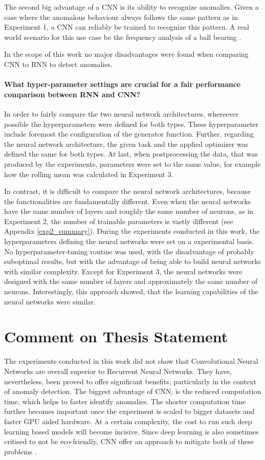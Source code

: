 The second big advantage of a CNN is its ability to recognize anomalies. Given a case where the anomalous behaviour always follows the same pattern as in Experiment 1, a CNN can reliably be trained to recognize this pattern. A real world scenario for this use case be the frequency analysis of a ball bearing \parencite{Mais2002}.

In the scope of this work no major disadvantages were found when comparing CNN to RNN to detect anomalies.


\paragraph{What hyper-parameter settings are crucial for a fair performance comparison between RNN and CNN?} In order to fairly compare the two neural network architectures, whereever possible the hyperparameters were defined for both types. These hyperparameter include foremost the configuration of the generator function. Further, regarding the neural network architecture, the given task and the applied optimizer was defined the same for both types. At last, when postprocessing the data, that was produced by the experiments, parameters were set to the same value, for example how the rolling mean was calculated in Experiment 3.

In contrast, it is difficult to compare the neural network architectures, because the functionalities are fundamentally different. Even when the neural networks have the same number of layers and roughly the same number of neurons, as in Experiment 2, the number of trainable parameters is vastly different (see Appendix \ref{exp2_summary}). During the experiments conducted in this work, the hyperparameters defining the neural networks were set on a experimental basis. No hyperparameter-tuning routine was used, with the disadvantage of probably suboptimal results, but with the advantage of being able to build neural networks with similar complexity. Except for Experiment 3, the neural networks were designed with the same number of layers and approximately the same number of neurons. Interestingly, this approach showed, that the learning capabilities of the neural networks were similar.

\section{Comment on Thesis Statement}

The experiments conducted in this work did not show that Convolutional Neural Networks are overall superior to Recurrent Neural Networks. They have, nevertheless, been proved to offer significant benefits, particularly in the context of anomaly detection. The biggest advantage of CNN, is the reduced computation time, which helps to faster identify anomalies. The shorter computation time further becomes important once the experiment is scaled to bigger datasets and faster GPU aided hardware. At a certain complexity, the cost to run such deep learning based models will become incisive. Since deep learning is also sometimes critised to not be eco-friendly, CNN offer an approach to mitigate both of these problems \parencite{Walleser2021}.

